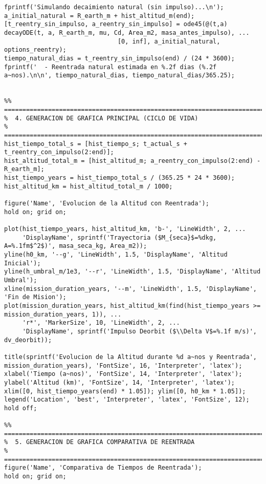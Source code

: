 \begin{verbatim}
fprintf('Simulando decaimiento natural (sin impulso)...\n');
a_initial_natural = R_earth_m + hist_altitud_m(end);
[t_reentry_sin_impulso, a_reentry_sin_impulso] = ode45(@(t,a) decayODE(t, a, R_earth_m, mu, Cd, Area_m2, masa_antes_impulso), ...
                               [0, inf], a_initial_natural, options_reentry);
tiempo_natural_dias = t_reentry_sin_impulso(end) / (24 * 3600);
fprintf('  - Reentrada natural estimada en %.2f dias (%.2f a~nos).\n\n', tiempo_natural_dias, tiempo_natural_dias/365.25);


%% ========================================================================
%  4. GENERACION DE GRAFICA PRINCIPAL (CICLO DE VIDA)
%  ========================================================================
hist_tiempo_total_s = [hist_tiempo_s; t_actual_s + t_reentry_con_impulso(2:end)];
hist_altitud_total_m = [hist_altitud_m; a_reentry_con_impulso(2:end) - R_earth_m];
hist_tiempo_years = hist_tiempo_total_s / (365.25 * 24 * 3600);
hist_altitud_km = hist_altitud_total_m / 1000;

figure('Name', 'Evolucion de la Altitud con Reentrada');
hold on; grid on;

plot(hist_tiempo_years, hist_altitud_km, 'b-', 'LineWidth', 2, ...
     'DisplayName', sprintf('Trayectoria ($M_{seca}$=%dkg, A=%.1fm$^2$)', masa_seca_kg, Area_m2));
yline(h0_km, '--g', 'LineWidth', 1.5, 'DisplayName', 'Altitud Inicial');
yline(h_umbral_m/1e3, '--r', 'LineWidth', 1.5, 'DisplayName', 'Altitud Umbral');
xline(mission_duration_years, '--m', 'LineWidth', 1.5, 'DisplayName', 'Fin de Mision');
plot(mission_duration_years, hist_altitud_km(find(hist_tiempo_years >= mission_duration_years, 1)), ...
     'r*', 'MarkerSize', 10, 'LineWidth', 2, ...
     'DisplayName', sprintf('Impulso Deorbit ($\\Delta V$=%.1f m/s)', dv_deorbit));

title(sprintf('Evolucion de la Altitud durante %d a~nos y Reentrada', mission_duration_years), 'FontSize', 16, 'Interpreter', 'latex');
xlabel('Tiempo (a~nos)', 'FontSize', 14, 'Interpreter', 'latex');
ylabel('Altitud (km)', 'FontSize', 14, 'Interpreter', 'latex');
xlim([0, hist_tiempo_years(end) * 1.05]); ylim([0, h0_km * 1.05]);
legend('Location', 'best', 'Interpreter', 'latex', 'FontSize', 12);
hold off;

%% ========================================================================
%  5. GENERACION DE GRAFICA COMPARATIVA DE REENTRADA 
%  ========================================================================
figure('Name', 'Comparativa de Tiempos de Reentrada');
hold on; grid on;


\end{verbatim}
